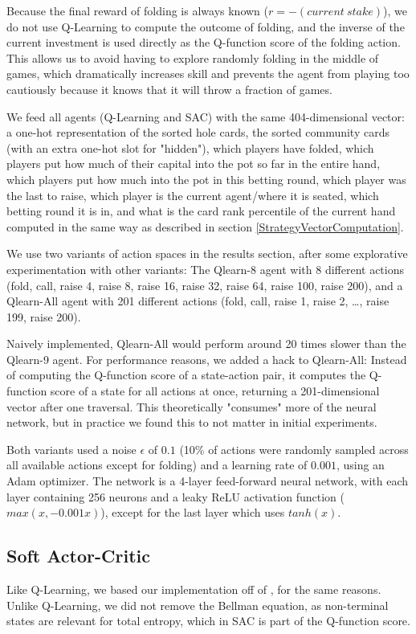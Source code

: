 Because the final reward of folding is always known ($r = -(current\ stake)$), we do not use Q-Learning to compute the outcome of folding, and the inverse of the current investment is used directly as the Q-function score of the folding action. This allows us to avoid having to explore randomly folding in the middle of games, which dramatically increases skill and prevents the agent from playing too cautiously because it knows that it will throw a fraction of games.

We feed all agents (Q-Learning and SAC) with the same 404-dimensional vector: a one-hot representation of the sorted hole cards, the sorted community cards (with an extra one-hot slot for "hidden"), which players have folded, which players put how much of their capital into the pot so far in the entire hand, which players put how much into the pot in this betting round, which player was the last to raise, which player is the current agent/where it is seated, which betting round it is in, and what is the card rank percentile of the current hand computed in the same way as described in section \ref{StrategyVectorComputation}.

We use two variants of action spaces in the results section, after some explorative experimentation with other variants: The Qlearn-8 agent with 8 different actions (fold, call, raise 4, raise 8, raise 16, raise 32, raise 64, raise 100, raise 200), and a Qlearn-All agent with 201 different actions (fold, call, raise 1, raise 2, \dots, raise 199, raise 200).

Naively implemented, Qlearn-All would perform around 20 times slower than the Qlearn-9 agent. For performance reasons, we added a hack to Qlearn-All: Instead of computing the Q-function score of a state-action pair, it computes the Q-function score of a state for all actions at once, returning a 201-dimensional vector after one traversal. This theoretically "consumes" more of the neural network, but in practice we found this to not matter in initial experiments.

Both variants used a noise $\epsilon$ of $0.1$ (10\% of actions were randomly sampled across all available actions except for folding) and a learning rate of $0.001$, using an Adam optimizer. The network is a 4-layer feed-forward neural network, with each layer containing 256 neurons and a leaky ReLU activation function ($max(x, -0.001x)$), except for the last layer which uses $tanh(x)$.

\subsection{Soft Actor-Critic}
Like Q-Learning, we based our implementation off of \cite{SpinningUp2018}, for the same reasons. Unlike Q-Learning, we did not remove the Bellman equation, as non-terminal states are relevant for total entropy, which in SAC is part of the Q-function score.

